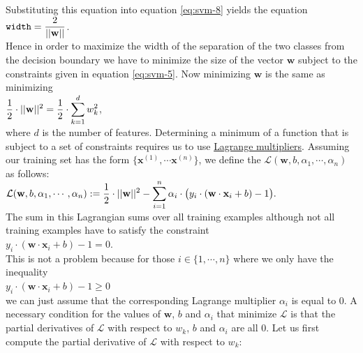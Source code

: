 Substituting this equation into equation \ref{eq:svm-8} yields the equation
\\[0.2cm]
\hspace*{1.3cm}
$\displaystyle \mathtt{width} = \frac{2}{||\mathbf{w}||}$.
\\[0.2cm]
Hence in order to maximize the width of the separation of the two classes from the decision boundary we have to
minimize the size of the vector $\textbf{w}$ subject to the constraints given in equation \ref{eq:svm-5}.  Now minimizing $\mathbf{w}$
is the same as minimizing
\\[0.2cm]
\hspace*{1.3cm}
$\displaystyle \frac{1}{2} \cdot ||\mathbf{w}||^2 = \frac{1}{2} \cdot \sum\limits_{k=1}^d w_k^2$,
\\[0.2cm]
where $d$ is the number of features.
Determining a minimum of a function that is subject to a set of constraints requires us to use 
\href{https://en.wikipedia.org/wiki/Lagrange_multiplier}{Lagrange multipliers}.  Assuming our training set 
has the form $\{ \mathbf{x}^{(1)}, \cdots \mathbf{x}^{(n)} \}$,
we define the  $\mathcal{L}(\mathbf{w}, b, \alpha_1, \cdots, \alpha_n)$ as follows:
\\[0.2cm]
\hspace*{1.3cm}
$\displaystyle \mathcal{L}(\mathbf{w}, b, \alpha_1, \cdots, \alpha_n) := 
 \frac{1}{2} \cdot ||\mathbf{w}||^2 - 
\sum\limits_{i=1}^n \alpha_i \cdot \bigl(y_i \cdot(\mathbf{w} \cdot \mathbf{x}_i + b) - 1\bigr).
$ 
\\[0.2cm]
The sum in this Lagrangian sums over all training examples although not all training examples have to satisfy
the constraint
\\[0.2cm]
\hspace*{1.3cm}
$y_i \cdot(\mathbf{w} \cdot \mathbf{x}_i + b) - 1 = 0$.
\\[0.2cm]
This is not a problem because for those $i \in \{1,\cdots,n\}$
where we only have the inequality
\\[0.2cm]
\hspace*{1.3cm}
$y_i \cdot(\mathbf{w} \cdot \mathbf{x}_i + b) - 1 \geq 0$
\\[0.2cm]
we can just assume that the corresponding Lagrange multiplier $\alpha_i$ is equal to $0$.
A necessary condition for the values of $\mathbf{w}$, $b$ and $\alpha_i$ that minimize $\mathcal{L}$ is that
the partial derivatives of $\mathcal{L}$ with respect to $w_k$, $b$ and $\alpha_i$ are all $0$.  Let us first compute the partial derivative of $\mathcal{L}$
with respect to $w_k$:
\\[0.2cm]
